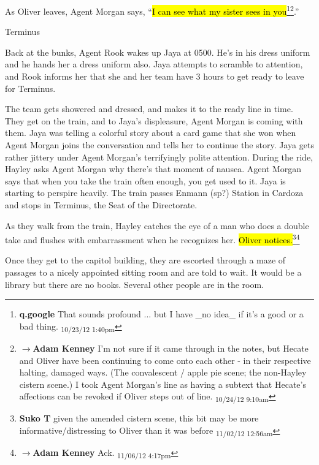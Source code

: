 As Oliver leaves, Agent Morgan says, ``\hl{I can see what my sister sees in you}\footnote{\textbf{q.google }That sounds profound ... but I have \_no idea\_ if it's a good or a bad thing. \textsubscript{10/23/12 1:40pm}}\footnote{$\rightarrow$\textbf{Adam Kenney }I'm not sure if it came through in the notes, but Hecate and Oliver have been continuing to come onto each other - in their respective halting, damaged ways.  (The convalescent / apple pie scene; the non-Hayley cistern scene.)  I took Agent Morgan's line as having a subtext that Hecate's affections can be revoked if Oliver steps out of line. \textsubscript{10/24/12 9:10am}}.''



 {\LARGE Terminus } 



Back at the bunks, Agent Rook wakes up Jaya at 0500. He's in his dress uniform and he hands her a dress uniform also.  Jaya attempts to scramble to attention, and Rook informs her that she and her team have 3 hours to get ready to leave for Terminus.



The team gets showered and dressed, and makes it to the ready line in time.  They get on the train, and to Jaya's displeasure, Agent Morgan is coming with them.  Jaya was telling a colorful story about a card game that she won when Agent Morgan joins the conversation and tells her to continue the story.  Jaya gets rather jittery under Agent Morgan's terrifyingly polite attention.  During the ride, Hayley asks Agent Morgan why there's that moment of nausea.  Agent Morgan says that when you take the train often enough, you get used to it.  Jaya is starting to perspire heavily.  The train passes Enmann (sp?) Station in Cardoza and stops in Terminus, the Seat of the Directorate.



As they walk from the train, Hayley catches the eye of a man who does a double take and flushes with embarrassment when he recognizes her.  \hl{Oliver notices.}\footnote{\textbf{Suko T }given the amended cistern scene, this bit may be more informative/distressing to Oliver than it was before \textsubscript{11/02/12 12:56am}}\footnote{$\rightarrow$\textbf{Adam Kenney }Ack. \textsubscript{11/06/12 4:17pm}}



Once they get to the capitol building, they are escorted through a maze of passages to a nicely appointed sitting room and are told to wait.  It would be a library but there are no books.  Several other people are in the room.   



